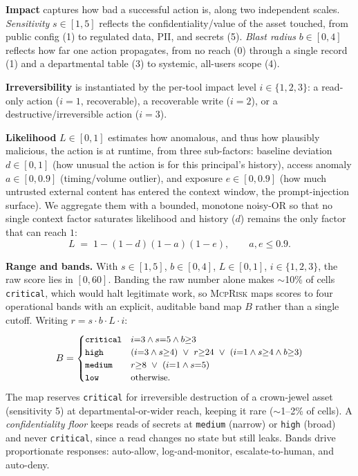 \documentclass[conference]{IEEEtran}
\newcommand{\framework}{\textsc{McpRisk}}
\begin{document}
\noindent\textbf{Impact} captures how bad a successful action is, along two
independent scales. \emph{Sensitivity} $s\in[1,5]$ reflects the
confidentiality/value of the asset touched, from public config (1) to regulated
data, PII, and secrets (5). \emph{Blast radius} $b\in[0,4]$ reflects how far one
action propagates, from no reach (0) through a single record (1) and a
departmental table (3) to systemic, all-users scope (4).

\noindent\textbf{Irreversibility} is instantiated by the per-tool impact level
$i\in\{1,2,3\}$: a read-only action ($i{=}1$, recoverable), a recoverable write
($i{=}2$), or a destructive/irreversible action ($i{=}3$).

\noindent\textbf{Likelihood} $L\in[0,1]$ estimates how anomalous, and thus how
plausibly malicious, the action is at runtime, from three sub-factors: baseline
deviation $d\in[0,1]$ (how unusual the action is for this principal's history),
access anomaly $a\in[0,0.9]$ (timing/volume outlier), and exposure
$e\in[0,0.9]$ (how much untrusted external content has entered the context window,
the prompt-injection surface). We aggregate them with a bounded, monotone
noisy-OR so that no single context factor saturates likelihood and history
($d$) remains the only factor that can reach $1$:
\begin{equation}
L \;=\; 1-(1-d)(1-a)(1-e), \qquad a,e\le 0.9 .
\label{eq:like}
\end{equation}

\noindent\textbf{Range and bands.} With $s\in[1,5]$, $b\in[0,4]$, $L\in[0,1]$,
$i\in\{1,2,3\}$, the raw score lies in $[0,60]$. Banding the raw number alone
makes $\sim$10\% of cells \texttt{critical}, which would halt legitimate work, so
\framework{} maps scores to four operational bands with an explicit, auditable
band map $B$ rather than a single cutoff. Writing $r=s\cdot b\cdot L\cdot i$:
\begin{equation*}
\small
B = \begin{cases}
\texttt{critical} & i{=}3 \wedge s{=}5 \wedge b{\ge}3\\
\texttt{high}     & (i{=}3 \wedge s{\ge}4)\ \vee\ r{\ge}24\ \vee\ (i{=}1\wedge s{\ge}4\wedge b{\ge}3)\\
\texttt{medium}   & r{\ge}8\ \vee\ (i{=}1\wedge s{=}5)\\
\texttt{low}      & \text{otherwise.}
\end{cases}
\end{equation*}
The map reserves \texttt{critical} for irreversible destruction of a crown-jewel
asset (sensitivity 5) at departmental-or-wider reach, keeping it rare
($\sim$1--2\% of cells). A \emph{confidentiality floor} keeps reads of secrets at
\texttt{medium} (narrow) or \texttt{high} (broad) and never \texttt{critical},
since a read changes no state but still leaks. Bands drive proportionate
responses: auto-allow, log-and-monitor, escalate-to-human, and auto-deny.
\end{document}
